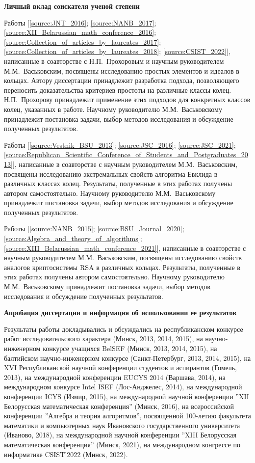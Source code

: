 \documentclass[_00_autoref.tex]{subfiles}
\begin{document}
\medskip
\centerline{\textbf{Личный вклад соискателя ученой степени}}

Работы [\ref{source:JNT_2016}; \ref{source:NANB_2017}; \ref{source:XII_Belarussian_math_conference_2016}; \ref{source:Collection_of_articles_by_laureates_2017}; \ref{source:Collection_of_articles_by_laureates_2018}; \ref{source:CSIST_2022}], написанные в соавторстве с Н.П.~Прохоровым и научным руководителем М.М.~Васьковским, посвящены исследованию простых элементов и идеалов в кольцах.
Автору диссертации принадлежит разработка подхода, позволяющего переносить доказательства критериев простоты на различные классы колец.
Н.П.~Прохорову принадлежит применение этих подходов для конкретных классов колец, указанных в работе.
Научному руководителю М.М.~Васьковскому принадлежит постановка задачи, выбор методов исследования и обсуждение полученных результатов.

Работы [\ref{source:Vestnik_BSU_2013}; \ref{source:JSC_2016}; \ref{source:JSC_2021}; \ref{source:Republican_Scientific_Conference_of_Students_and_Postgraduates_2013}], написанные в соавторстве с научным руководителем М.М.~Васьковским, посвящены исследованию экстремальных свойств алгоритма Евклида в различных  классах колец.
Результаты, полученные  в этих работах получены  автором самостоятельно.
Научному руководителю М.М.~Васьковскому принадлежит постановка задачи, выбор методов исследования и обсуждение полученных результатов.

Работы [\ref{source:NANB_2015}; \ref{source:BSU_Journal_2020}; \ref{source:Algebra_and_theory_of_algorithms}; \ref{source:XIII_Belarussian_math_conference_2021}], написанные в соавторстве с научным руководителем М.М.~Васьковским, посвящены исследованию свойств аналогов криптосистемы RSA в различных кольцах.
Результаты, полученные  в этих работах получены  автором самостоятельно.
Научному руководителю М.М.~Васьковскому принадлежит постановка задачи, выбор методов исследования и обсуждение полученных результатов.

\medskip
\centerline{\textbf{Апробация диссертации и информация об использовании ее результатов}}

Результаты работы докладывались и обсуждались
на республиканском конкурсе работ исследовательского характера (Минск, 2013, 2014, 2015),
на научно-инженерном конкурсе учащихся BelSEF (Минск, 2013, 2014, 2015),
на балтийском научно-инженерном конкурсе (Санкт-Петербург, 2013, 2014, 2015),
на XVI Республиканской научной конференции студентов и аспирантов (Гомель, 2013),
на международной конференции EUCYS 2014 (Варшава, 2014),
на международном конкурсе Intel ISEF (Лос-Анджелес, 2014),
на международной конференции ICYS (Измир, 2015),
на международной научной конференции ''XII Белорусская математическая конференция'' (Минск, 2016),
на всероссийской конференции ''Алгебра и теория алгоритмов'', посвященной 100-летию факультета математики и компьютерных наук Ивановского государственного университета (Иваново, 2018),
на международной научной конференции ''XIII Белорусская математическая конференция'' (Минск, 2021),
на международном конгрессе по информатике CSIST'2022 (Минск, 2022).
\end{document}
